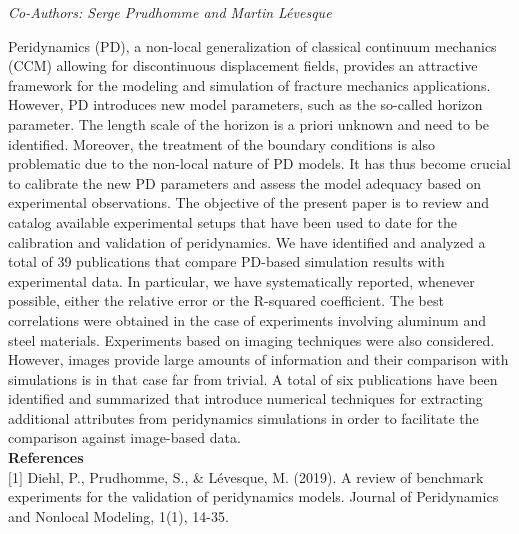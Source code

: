 \begin{center}
\textit{Co-Authors: Serge Prudhomme and Martin Lévesque}
\end{center} 
Peridynamics (PD), a non-local generalization of classical continuum mechanics (CCM) allowing for discontinuous displacement fields, provides an attractive framework for the modeling and simulation of fracture mechanics applications. However, PD introduces new model parameters, such as the so-called horizon parameter. The length scale of the horizon is a priori unknown and need to be identified. Moreover, the treatment of the boundary conditions is also problematic due to the non-local nature of PD models. It has thus become crucial to calibrate the new PD parameters and assess the model adequacy based on experimental observations. The objective of the present paper is to review and catalog available experimental setups that have been used to date for the calibration and validation of peridynamics. We have identified and analyzed a total of 39 publications that compare PD-based simulation results with experimental data. In particular, we have systematically reported, whenever possible, either the relative error or the R-squared coefficient. The best correlations were obtained in the case of experiments involving aluminum and steel materials. Experiments based on imaging techniques were also considered. However, images provide large amounts of information and their comparison with simulations is in that case far from trivial. A total of six publications have been identified and summarized that introduce numerical techniques for extracting additional attributes from peridynamics simulations in order to facilitate the comparison against image-based data.\\

\noindent\textbf{References}\\
$[$1$]$ Diehl, P., Prudhomme, S., \& Lévesque, M. (2019). A review of benchmark experiments for the validation of peridynamics models. Journal of Peridynamics and Nonlocal Modeling, 1(1), 14-35.

